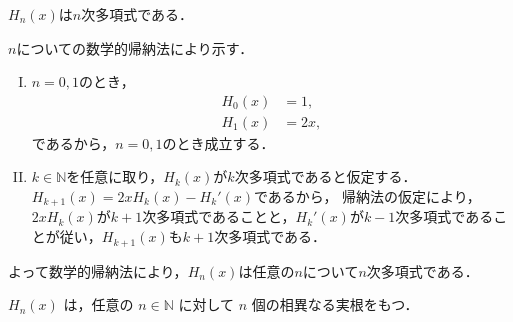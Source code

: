 \begin{proposition}{}{}
  $H_n (x)$は$n$次多項式である．
\end{proposition}

\begin{tproof}
  $n$についての数学的帰納法により示す．
  \begin{enumerate}[(I)]
    \item $n =0, 1$のとき，
          \begin{align*}
            H_0 (x) & = 1,  \\
            H_1 (x) & = 2x,
          \end{align*}
          であるから，$n=0, 1 $のとき成立する．
    \item $k \in \mathbb{N}$を任意に取り，$H_k (x)$が$k$次多項式であると仮定する．
          $ H_{k+1}(x) =  2x H_k(x)-H_k'(x)$であるから，
          帰納法の仮定により，$ 2 x H_k (x)$が$k+1$次多項式であることと，$H_k'(x)$が$k-1$次多項式であることが従い，$H_{k+1}(x)$も$k+1$次多項式である．
  \end{enumerate}
  よって数学的帰納法により，$H_n (x)$は任意の$n$について$n$次多項式である．
\end{tproof}

\begin{proposition}{}{}
  $H_n(x)$ は，任意の $n \in \mathbb{N}$ に対して $n$ 個の相異なる実根をもつ．
\end{proposition}

